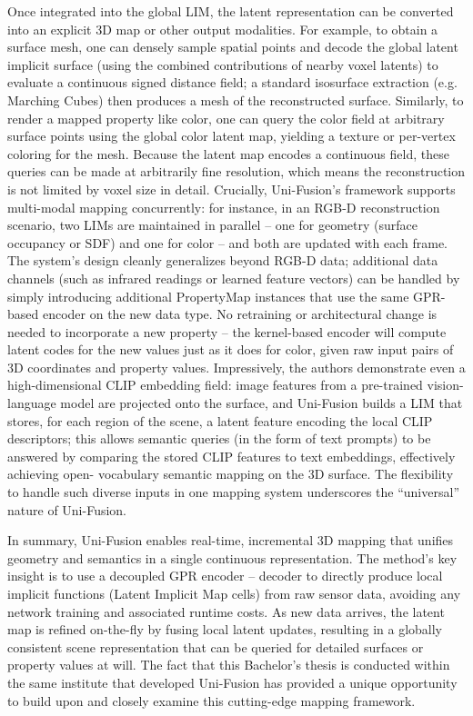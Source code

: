 \documentclass[english, bachelor, utf8]{base/thesis_telematics}
\begin{document}
Once integrated into the global LIM, the latent representation can be converted into an explicit 3D map or other output
modalities. For example, to obtain a surface mesh, one can densely sample spatial points and decode the global latent implicit
surface (using the combined contributions of nearby voxel latents) to evaluate a continuous signed distance field; a standard
isosurface extraction (e.g. Marching Cubes) then produces a mesh of the reconstructed surface. Similarly, to render a mapped
property like color, one can query the color field at arbitrary surface points using the global color latent map, yielding a texture
or per-vertex coloring for the mesh. Because the latent map encodes a continuous field, these queries can be made at arbitrarily
fine resolution, which means the reconstruction is not limited by voxel size in detail. Crucially, Uni-Fusion's framework supports
multi-modal mapping concurrently: for instance, in an RGB-D reconstruction scenario, two LIMs are maintained in parallel -- one
for geometry (surface occupancy or SDF) and one for color -- and both are updated with each frame. The system's design cleanly
generalizes beyond RGB-D data; additional data channels (such as infrared readings or learned feature vectors)
can be handled by simply introducing additional PropertyMap instances that use the same
GPR-based encoder on the new data type. No retraining or architectural change is needed to incorporate a
new property -- the kernel-based encoder will compute latent codes for the new values just as it does for color, given raw input
pairs of 3D coordinates and property values. Impressively, the authors demonstrate even a high-dimensional CLIP embedding
field: image features from a pre-trained vision-language model are projected onto the surface, and Uni-Fusion builds a LIM that
stores, for each region of the scene, a latent feature encoding the local CLIP descriptors; this allows semantic queries (in the
form of text prompts) to be answered by comparing the stored CLIP features to text embeddings, effectively achieving open-
vocabulary semantic mapping on the 3D surface. The flexibility to handle such diverse inputs in one mapping
system underscores the “universal” nature of Uni-Fusion.

In summary, Uni-Fusion enables real-time, incremental 3D mapping that unifies geometry and semantics in a single continuous
representation. The method's key insight is to use a decoupled GPR encoder -- decoder to directly produce local implicit functions
(Latent Implicit Map cells) from raw sensor data, avoiding any network training and associated runtime costs. As new data arrives,
the latent map is refined on-the-fly by fusing local latent updates, resulting in a globally
consistent scene representation that can be queried for detailed surfaces or property values at will. The fact that this Bachelor's
thesis is conducted within the same institute that developed Uni-Fusion has provided a unique opportunity to build upon and
closely examine this cutting-edge mapping framework.
\end{document}
